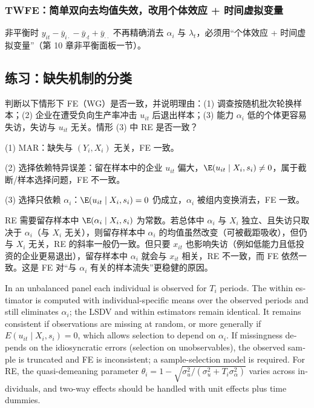 \subsubsection{TWFE：简单双向去均值失效，改用个体效应 + 时间虚拟变量}

非平衡时 $y_{it}-\bar y_{i\cdot}-\bar y_{\cdot t}+\bar y_{\cdot\cdot}$ 不再精确消去 $\alpha_i$ 与 $\lambda_t$，必须用“个体效应 + 时间虚拟变量”（第 10 章非平衡面板一节）。

\subsection{练习：缺失机制的分类}

\begin{prac}[缺失机制的分类]\label{pr:U11b-miss}
判断以下情形下 FE（WG）是否一致，并说明理由：(1) 调查按随机批次轮换样本；(2) 企业在遭受负向生产率冲击 $u_{it}$ 后退出样本；(3) 能力 $\alpha_i$ 低的个体更容易失访，失访与 $u_{it}$ 无关。情形 (3) 中 RE 是否一致？

\answer (1) MAR：缺失与 $(Y_i,X_i)$ 无关，FE 一致。

(2) 选择依赖特异误差：留在样本中的企业 $u_{it}$ 偏大，$\E(u_{it}\mid X_i,s_i)\neq0$，属于截断/样本选择问题，FE 不一致。

(3) 选择只依赖 $\alpha_i$：$\E(u_{it}\mid X_i,s_i)=0$ 仍成立，$\alpha_i$ 被组内变换消去，FE 一致。

RE 需要留存样本中 $\E(\alpha_i\mid X_i,s_i)$ 为常数。若总体中 $\alpha_i$ 与 $X_i$ 独立、且失访只取决于 $\alpha_i$（与 $X_i$ 无关），则留存样本中 $\alpha_i$ 的均值虽然改变（可被截距吸收），但仍与 $X_i$ 无关，RE 的斜率一般仍一致。但只要 $x_{it}$ 也影响失访（例如低能力且低投资的企业更易退出），留存样本中 $\alpha_i$ 就会与 $x_{it}$ 相关，RE 不一致，而 FE 依然一致。这是 FE 对“与 $\alpha_i$ 有关的样本流失”更稳健的原因。
\end{prac}

\begin{english}
In an unbalanced panel each individual is observed for $T_i$ periods. The within estimator is computed with individual-specific means over the observed periods and still eliminates $\alpha_i$; the LSDV and within estimators remain identical. It remains consistent if observations are missing at random, or more generally if $E(u_{it}\mid X_i,s_i)=0$, which allows selection to depend on $\alpha_i$. If missingness depends on the idiosyncratic errors (selection on unobservables), the observed sample is truncated and FE is inconsistent; a sample-selection model is required. For RE, the quasi-demeaning parameter $\theta_i=1-\sqrt{\sigma_u^2/(\sigma_u^2+T_i\sigma_\alpha^2)}$ varies across individuals, and two-way effects should be handled with unit effects plus time dummies.
\end{english}

